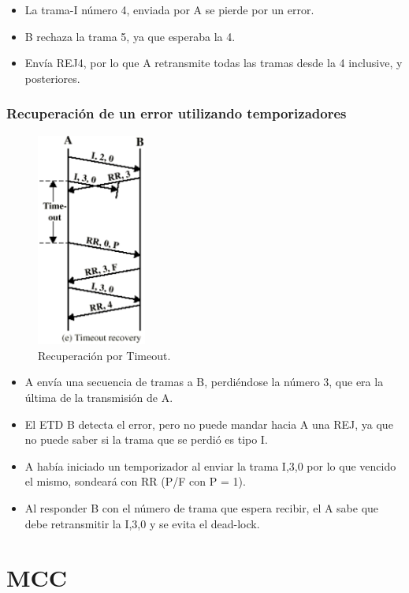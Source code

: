 \documentclass[withindex,glossary]{cam-thesis}
\begin{document}
\begin{itemize}
  \item La trama-I número 4, enviada por A se pierde por un error.
  \item B rechaza la trama 5, ya que esperaba la 4.
  \item Envía REJ4, por lo que A retransmite todas las tramas desde la 4 inclusive, y posteriores.
\end{itemize}

\subsubsection{Recuperación de un error utilizando temporizadores}

\begin{figure}[H]
\centering
\includegraphics[height=7.0cm]{images/HDLC_TimeoutRecovery}
\caption[Recuperación por Timeout]{Recuperación por Timeout.}
\end{figure}

\begin{itemize}
  \item A envía una secuencia de tramas a B, perdiéndose la número 3, que era la última de la transmisión de A.
  \item El ETD B detecta el error, pero no puede mandar hacia A una REJ, ya que no puede saber si la trama que se perdió es tipo I.
  \item A había iniciado un temporizador al enviar la trama I,3,0 por lo que vencido el mismo, sondeará con RR (P/F con P = 1).
  \item Al responder B con el número de trama que espera recibir, el A sabe que debe retransmitir la I,3,0 y se evita el dead-lock.
\end{itemize}

\section{MCC} \label{sec: Marco Teo :: MCC}
\end{document}
